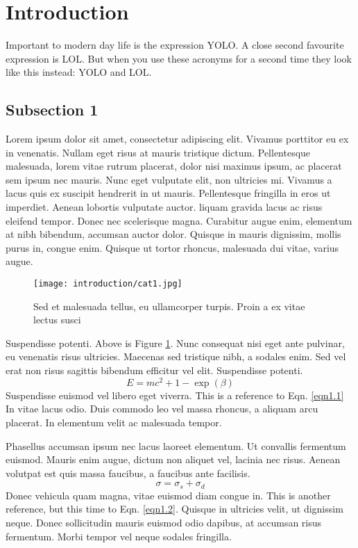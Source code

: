 \section{Introduction}
\lipsum[1-2]

Important to modern day life is the expression \gls{YOLO}. 
A close second favourite expression is \gls{LOL}.
But when you use these acronyms for a second time they look like this instead: \gls{YOLO} and \gls{LOL}.
\subsection{Subsection 1}

Lorem ipsum dolor sit amet\autocite{frenkel_smit_2012}, consectetur adipiscing elit.\autocite{mutiso_electrical_2015} 
Vivamus porttitor eu ex in venenatis. 
Nullam eget risus at mauris\autocite{mutiso_electrical_2015} tristique dictum. Pellentesque malesuada, lorem vitae rutrum placerat, dolor nisi maximus ipsum, ac placerat sem ipsum nec mauris. 
Nunc eget vulputate elit, non ultricies mi. 
Vivamus a lacus quis ex suscipit hendrerit in ut mauris. 
Pellentesque fringilla in eros ut imperdiet. 
Aenean lobortis vulputate auctor. 
liquam gravida lacus ac risus eleifend tempor. 
Donec nec scelerisque magna. 
Curabitur augue enim, elementum at nibh bibendum, accumsan auctor dolor. 
Quisque in mauris dignissim, mollis purus in, congue enim. 
Quisque ut tortor rhoncus, malesuada dui vitae, varius augue.

\begin{figure}[t]
    \centering
    \texttt{[image: introduction/cat1.jpg]}
    \caption[This is a caption for the list of figures]{Sed et malesuada tellus, eu ullamcorper turpis. Proin a ex vitae lectus susci}
    \label{testfig}
\end{figure}

Suspendisse potenti.
Above is Figure \ref{testfig}.
Nunc consequat nisi eget ante pulvinar, eu venenatis risus ultricies. 
Maecenas sed tristique nibh, a sodales enim. 
Sed vel erat non risus sagittis bibendum efficitur vel elit. 
Suspendisse potenti.
\begin{equation} \label{eqn1.1}
    E = mc^2 + 1 - \exp(\beta)
\end{equation}
Suspendisse euismod vel libero eget viverra. 
This is a reference to Eqn. \ref{eqn1.1}
In vitae lacus odio. Duis commodo leo vel massa rhoncus, a aliquam arcu placerat. 
In elementum velit ac malesuada tempor.

Phasellus accumsan ipsum nec lacus laoreet elementum. 
Ut convallis fermentum euismod. 
Mauris enim augue, dictum non aliquet vel, lacinia nec risus. 
Aenean volutpat est quis massa faucibus, a faucibus ante facilisis. 
\begin{equation} \label{eqn1.2}
    \sigma = \sigma_s + \sigma_d
\end{equation}
Donec vehicula quam magna, vitae euismod diam congue in. 
This is another reference, but this time to Eqn. \ref{eqn1.2}.
Quisque in ultricies velit, ut dignissim neque. 
Donec sollicitudin mauris euismod odio dapibus, at accumsan risus fermentum. 
Morbi tempor vel neque sodales fringilla.

